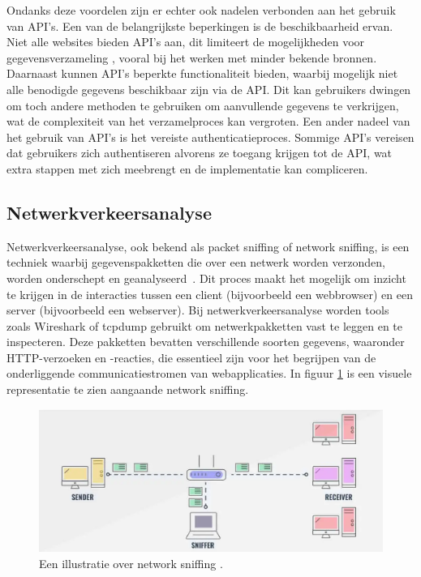 Ondanks deze voordelen zijn er echter ook nadelen verbonden aan het gebruik van API's. Een van de belangrijkste beperkingen is de beschikbaarheid ervan. Niet alle websites bieden API's aan, dit limiteert de mogelijkheden voor gegevensverzameling , vooral bij het werken met minder bekende bronnen.
Daarnaast kunnen API's beperkte functionaliteit bieden, waarbij mogelijk niet alle benodigde gegevens beschikbaar zijn via de API. Dit kan gebruikers dwingen om toch andere methoden te gebruiken om aanvullende gegevens te verkrijgen, wat de complexiteit van het verzamelproces kan vergroten.
Een ander nadeel van het gebruik van API's is het vereiste authenticatieproces. Sommige API's vereisen dat gebruikers zich authentiseren alvorens ze toegang krijgen tot de API, wat extra stappen met zich meebrengt en de implementatie kan compliceren.

\subsection{Netwerkverkeersanalyse}
Netwerkverkeersanalyse, ook bekend als packet sniffing of network sniffing, is een techniek waarbij gegevenspakketten die over een netwerk worden verzonden, worden onderschept en geanalyseerd~\autocite{Chapple2018}. Dit proces maakt het mogelijk om inzicht te krijgen in de interacties tussen een client (bijvoorbeeld een webbrowser) en een server (bijvoorbeeld een webserver).
Bij netwerkverkeersanalyse worden tools zoals Wireshark of tcpdump gebruikt om netwerkpakketten vast te leggen en te inspecteren. Deze pakketten bevatten verschillende soorten gegevens, waaronder HTTP-verzoeken en -reacties, die essentieel zijn voor het begrijpen van de onderliggende communicatiestromen van webapplicaties. In figuur \ref{fig:networksniffing} is een visuele representatie te zien aangaande network sniffing.
\begin{figure}[h]
    \centering
    \includegraphics[width=\linewidth]{graphics/networksniffing.png}
    \caption{Een illustratie over network sniffing \autocite{Lote2024}.}
    \label{fig:networksniffing}
\end{figure}


